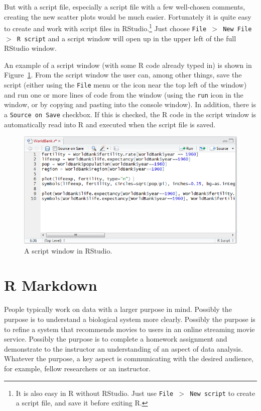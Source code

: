 \documentclass[12pt,oneside]{book}\usepackage[]{graphicx}\usepackage[]{color}
\begin{document}
But with a script file, especially a script file with a few well-chosen comments, creating the new scatter plots would be much easier. Fortunately it is quite easy to create and work with script files in RStudio.\footnote{It is also easy in R without RStudio. Just use \texttt{File $>$ New script} to create a script file, and save it before exiting R.} Just choose \texttt{File $>$ New File $>$ R script} and a script window will open up in the upper left of the full RStudio window. 

An example of a script window (with some R code already typed in) is shown in Figure~\ref{FIG:SCRIPT}. From the script window the user can, among other things, save the script (either using the \texttt{File} menu or the icon near the top left of the window) and run one or more lines of code from the window (using the \texttt{run} icon in the window, or by copying and pasting into the console window). In addition, there is a \texttt{Source on Save} checkbox. If this is checked, the R code in the script window is automatically read into R and executed when the script file is saved.

\begin{figure}[htbp]
\includegraphics[width=6in]{03-rMarkdown/03-images/ScriptWindow.PNG}
\caption{A script window in RStudio.}
\label{FIG:SCRIPT}
\end{figure}

\section{R Markdown}
People typically work on data with a larger purpose in mind. Possibly the purpose is to understand a biological system more clearly. Possibly the purpose is to refine a system that recommends movies to users in an online streaming movie service. Possibly the purpose is to complete a homework assignment and demonstrate to the instructor an understanding of an aspect of data analysis. Whatever the purpose, a key aspect is communicating with the desired audience, for example, fellow researchers or an instructor. 
\end{document}
